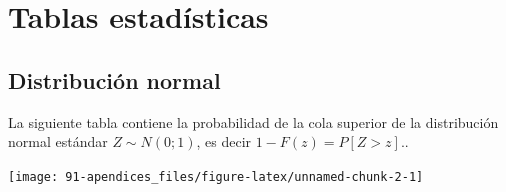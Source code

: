 \documentclass[
]{book}
\begin{document}
\hypertarget{tablas}{%
\chapter{Tablas estadísticas}\label{tablas}}

\hypertarget{distribuciuxf3n-normal}{%
\section{Distribución normal}\label{distribuciuxf3n-normal}}

La siguiente tabla contiene la probabilidad de la cola superior de la distribución normal estándar \(Z\sim N(0;1)\),
es decir \(1-F(z)=P[Z>z].\).

\texttt{[image: 91-apendices\_files/figure-latex/unnamed-chunk-2-1]}
\end{document}
